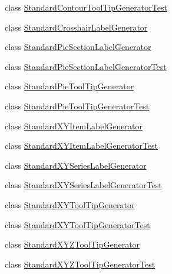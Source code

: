 \begin{DoxyCompactItemize}
class \mbox{\hyperlink{classorg_1_1jfree_1_1chart_1_1labels_1_1_standard_contour_tool_tip_generator_test}{Standard\+Contour\+Tool\+Tip\+Generator\+Test}}
\item 
class \mbox{\hyperlink{classorg_1_1jfree_1_1chart_1_1labels_1_1_standard_crosshair_label_generator}{Standard\+Crosshair\+Label\+Generator}}
\item 
class \mbox{\hyperlink{classorg_1_1jfree_1_1chart_1_1labels_1_1_standard_pie_section_label_generator}{Standard\+Pie\+Section\+Label\+Generator}}
\item 
class \mbox{\hyperlink{classorg_1_1jfree_1_1chart_1_1labels_1_1_standard_pie_section_label_generator_test}{Standard\+Pie\+Section\+Label\+Generator\+Test}}
\item 
class \mbox{\hyperlink{classorg_1_1jfree_1_1chart_1_1labels_1_1_standard_pie_tool_tip_generator}{Standard\+Pie\+Tool\+Tip\+Generator}}
\item 
class \mbox{\hyperlink{classorg_1_1jfree_1_1chart_1_1labels_1_1_standard_pie_tool_tip_generator_test}{Standard\+Pie\+Tool\+Tip\+Generator\+Test}}
\item 
class \mbox{\hyperlink{classorg_1_1jfree_1_1chart_1_1labels_1_1_standard_x_y_item_label_generator}{Standard\+X\+Y\+Item\+Label\+Generator}}
\item 
class \mbox{\hyperlink{classorg_1_1jfree_1_1chart_1_1labels_1_1_standard_x_y_item_label_generator_test}{Standard\+X\+Y\+Item\+Label\+Generator\+Test}}
\item 
class \mbox{\hyperlink{classorg_1_1jfree_1_1chart_1_1labels_1_1_standard_x_y_series_label_generator}{Standard\+X\+Y\+Series\+Label\+Generator}}
\item 
class \mbox{\hyperlink{classorg_1_1jfree_1_1chart_1_1labels_1_1_standard_x_y_series_label_generator_test}{Standard\+X\+Y\+Series\+Label\+Generator\+Test}}
\item 
class \mbox{\hyperlink{classorg_1_1jfree_1_1chart_1_1labels_1_1_standard_x_y_tool_tip_generator}{Standard\+X\+Y\+Tool\+Tip\+Generator}}
\item 
class \mbox{\hyperlink{classorg_1_1jfree_1_1chart_1_1labels_1_1_standard_x_y_tool_tip_generator_test}{Standard\+X\+Y\+Tool\+Tip\+Generator\+Test}}
\item 
class \mbox{\hyperlink{classorg_1_1jfree_1_1chart_1_1labels_1_1_standard_x_y_z_tool_tip_generator}{Standard\+X\+Y\+Z\+Tool\+Tip\+Generator}}
\item 
class \mbox{\hyperlink{classorg_1_1jfree_1_1chart_1_1labels_1_1_standard_x_y_z_tool_tip_generator_test}{Standard\+X\+Y\+Z\+Tool\+Tip\+Generator\+Test}}

\end{DoxyCompactItemize}
